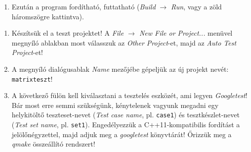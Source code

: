 \begin{frame}
  \begin{enumerate}
    \setcounter{enumi}{\theqt}
    \item Ezután a program fordítható, futtatható (\emph{Build} $\to$ \emph{Run}, vagy a zöld háromszögre kattintva).\\
    \setcounter{qt}{\theenumi}
  \end{enumerate}
\end{frame}

\begin{frame}
  \begin{enumerate}
    \setcounter{enumi}{\theqt}
    \item Készítsük el a teszt projektet! A \emph{File $\to$ New File or Project...} menüvel megnyíló ablakban most válasszuk az \emph{Other Project}-et, majd az \emph{Auto Test Project}-et!\\
    \item A megnyíló dialógusablak \emph{Name} mezőjébe gépeljük az új projekt nevét: \texttt{matrixteszt}!
    \item A következő fülön kell kiválasztani a tesztelés eszközét, ami legyen \emph{Googletest}! Bár most erre semmi szükségünk, kénytelenek vagyunk megadni egy helykitöltő teszteset-nevet (\emph{Test case name}, pl. \texttt{case1}) és tesztkészlet-nevet (\emph{Test set name}, pl. \texttt{set1}). Engedélyezzük a C++11-kompatibilis fordítást a jelölőnégyzettel, majd adjuk meg a \emph{googletest} könyvtárát! Őrizzük meg a \emph{qmake} összeállító rendszert!\\
    \setcounter{qt}{\theenumi}
  \end{enumerate}
\end{frame}

